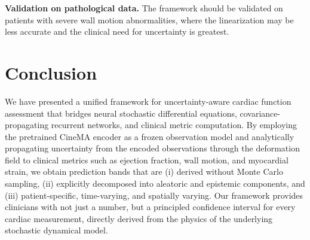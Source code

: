 \documentclass[10pt,twocolumn]{article}
\begin{document}
\textbf{Validation on pathological data.} The framework should be validated on patients with severe wall motion abnormalities, where the linearization may be less accurate and the clinical need for uncertainty is greatest.

\section{Conclusion}
\label{sec:conclusion}

We have presented a unified framework for uncertainty-aware cardiac function assessment that bridges neural stochastic differential equations, covariance-propagating recurrent networks, and clinical metric computation. By employing the pretrained CineMA encoder as a frozen observation model and analytically propagating uncertainty from the encoded observations through the deformation field to clinical metrics such as ejection fraction, wall motion, and myocardial strain, we obtain prediction bands that are (i) derived without Monte Carlo sampling, (ii) explicitly decomposed into aleatoric and epistemic components, and (iii) patient-specific, time-varying, and spatially varying. Our framework provides clinicians with not just a number, but a principled confidence interval for every cardiac measurement, directly derived from the physics of the underlying stochastic dynamical model.

\newpage

\end{document}
